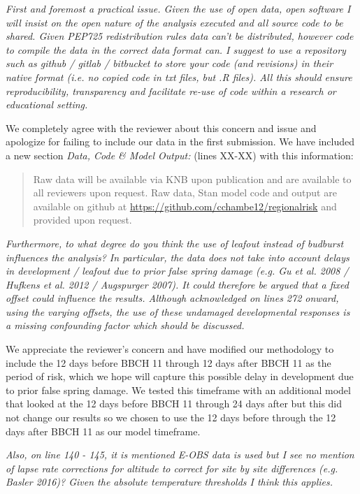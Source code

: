 \documentclass[11pt,a4paper]{article}
\begin{document}
\textit{First and foremost a practical issue. Given the use of open data, open software I will insist on the open nature of the analysis executed and all source code to be shared. Given PEP725 redistribution rules data can't be distributed, however code to compile the data in the correct data format can. I suggest to use a repository such as github / gitlab / bitbucket to store your code (and revisions) in their native format (i.e. no copied code in txt files, but .R files). All this should ensure reproducibility, transparency and facilitate re-use of code within a research or educational setting.}

We completely agree with the reviewer about this concern and issue and apologize for failing to include our data in the first submission. We have included a new section \textit{Data, Code \& Model Output:} (lines XX-XX) with this information:

\begin{quotation}
\noindent  Raw data will be available via KNB upon publication and are available to all reviewers upon request. Raw data, {Stan} model code and output are available on github at \url{https://github.com/cchambe12/regionalrisk} and provided upon request.
\end{quotation}

\textit{Furthermore, to what degree do you think the use of leafout instead of budburst influences the analysis? In particular, the data does not take into account delays in development / leafout due to prior false spring damage (e.g. Gu et al. 2008 / Hufkens et al. 2012 / Augspurger 2007). It could therefore be argued that a fixed offset could influence the results. Although acknowledged on lines 272 onward, using the varying offsets, the use of these undamaged developmental responses is a missing confounding factor which should be discussed.}

We appreciate the reviewer's concern and have modified our methodology to include the 12 days before BBCH 11 through 12 days after BBCH 11 as the period of risk, which we hope will capture this possible delay in development due to prior false spring damage. We tested this timeframe with an additional model that looked at the 12 days before BBCH 11 through 24 days after but this did not change our results so we chosen to use the 12 days before through the 12 days after BBCH 11 as our model timeframe.

\textit{Also, on line 140 - 145, it is mentioned E-OBS data is used but I see no mention of lapse rate corrections for altitude to correct for site by site differences (e.g. Basler 2016)? Given the absolute temperature thresholds I think this applies.}
\end{document}
